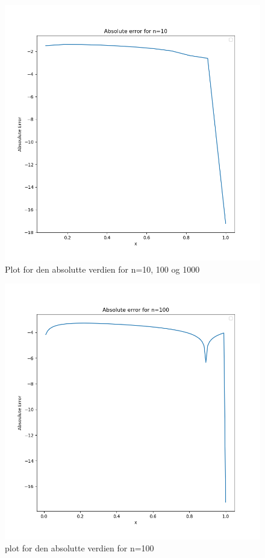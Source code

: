 \documentclass[english,notitlepage]{revtex4-1}  %
\begin{document}
\begin{figure}
	\centering
	\includegraphics[scale=0.5]{Images/abserrn10.png}
	\caption{Plot for den absolutte verdien for n=10, 100 og 1000}
	\label{abserrn10}
\end{figure}
\begin{figure}
	\centering
	\includegraphics[scale=0.5]{Images/abserrn100.png}
	\caption{plot for den absolutte verdien for n=100}
	\label{abserrn100}
\end{figure}
\end{document}
